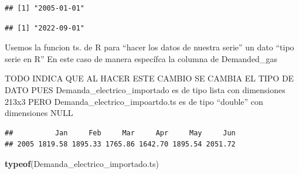 \documentclass[
]{article}
\newenvironment{Shaded}{\begin{snugshade}}{\end{snugshade}}
\newcommand{\AttributeTok}[1]{\textcolor[rgb]{0.13,0.29,0.53}{#1}}
\newcommand{\DecValTok}[1]{\textcolor[rgb]{0.00,0.00,0.81}{#1}}
\newcommand{\FunctionTok}[1]{\textcolor[rgb]{0.13,0.29,0.53}{\textbf{#1}}}
\newcommand{\NormalTok}[1]{#1}
\newcommand{\OtherTok}[1]{\textcolor[rgb]{0.56,0.35,0.01}{#1}}
\newcommand{\SpecialCharTok}[1]{\textcolor[rgb]{0.81,0.36,0.00}{\textbf{#1}}}
\begin{document}
\begin{verbatim}
## [1] "2005-01-01"
\end{verbatim}

\begin{Shaded}
\end{Shaded}

\begin{verbatim}
## [1] "2022-09-01"
\end{verbatim}

Usemos la funcion ts. de R para ``hacer los datos de nuestra serie'' un
dato ``tipo serie en R'' En este caso de manera específca la columna de
Demanded\_gas

TODO INDICA QUE AL HACER ESTE CAMBIO SE CAMBIA EL TIPO DE DATO PUES
Demanda\_electrico\_importado es de tipo lista con dimensiones 213x3
PERO Demanda\_electrico\_impoartdo.ts es de tipo ``double'' con
dimensiones NULL

\begin{Shaded}
\end{Shaded}

\begin{verbatim}
##          Jan     Feb     Mar     Apr     May     Jun
## 2005 1819.58 1895.33 1765.86 1642.70 1895.54 2051.72
\end{verbatim}

\begin{Shaded}
\begin{Highlighting}[]
\FunctionTok{typeof}\NormalTok{(Demanda\_electrico\_importado.ts)}
\end{Highlighting}
\end{Shaded}
\end{document}
